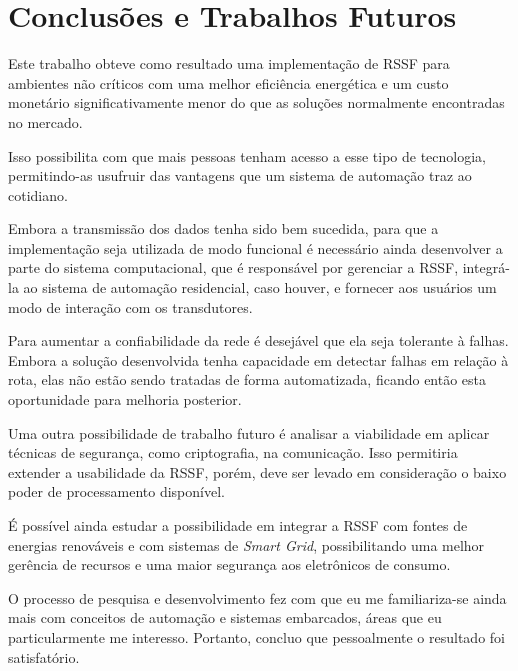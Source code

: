 \chapter{Conclusões e Trabalhos Futuros}
\label{cap:conclusao}
Este trabalho obteve como resultado uma implementação de RSSF para ambientes não críticos com uma melhor
eficiência energética e um custo monetário significativamente menor do que as soluções normalmente encontradas
no mercado.

Isso possibilita com que mais pessoas tenham acesso a esse tipo de tecnologia, permitindo-as usufruir das
vantagens que um sistema de automação traz ao cotidiano.

Embora a transmissão dos dados tenha sido bem sucedida, para que a implementação seja utilizada de modo
funcional é necessário ainda desenvolver a parte do sistema computacional, que é responsável por gerenciar a
RSSF, integrá-la ao sistema de automação residencial, caso houver, e fornecer aos usuários um modo de
interação com os transdutores.

Para aumentar a confiabilidade da rede é desejável que ela seja tolerante à falhas. Embora a solução
desenvolvida tenha capacidade em detectar falhas em relação à rota, elas não estão sendo tratadas de forma
automatizada, ficando então esta oportunidade para melhoria posterior.

Uma outra possibilidade de trabalho futuro é analisar a viabilidade em aplicar técnicas de segurança, como
criptografia, na comunicação. Isso permitiria extender a usabilidade da RSSF, porém, deve ser levado em
consideração o baixo poder de processamento disponível.

É possível ainda estudar a possibilidade em integrar a RSSF com fontes de energias renováveis e com sistemas
de \textit{Smart Grid}, possibilitando uma melhor gerência de recursos e uma maior segurança aos eletrônicos
de consumo.

O processo de pesquisa e desenvolvimento fez com que eu me familiariza-se ainda mais com conceitos de
automação e sistemas embarcados, áreas que eu particularmente me interesso. Portanto, concluo que pessoalmente
o resultado foi satisfatório.
